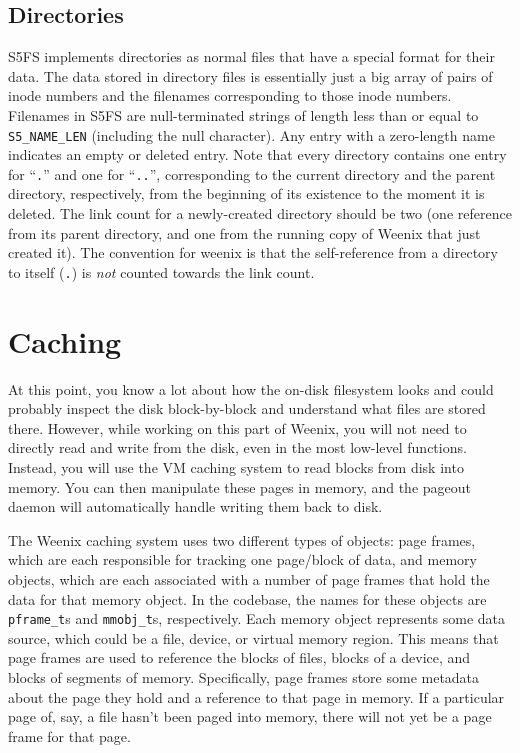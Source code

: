 \subsection{Directories} \label{directories}

S5FS implements directories as normal files that have a special format for their data. The data stored in directory files is essentially just a big array of pairs of inode numbers and the filenames corresponding to those inode numbers. Filenames in S5FS are null-terminated strings of length less than or equal to \texttt{S5\_NAME\_LEN} (including the null character). Any entry with a zero-length name indicates an empty or deleted entry. Note that every directory contains one entry for ``\texttt{.}'' and one for ``\texttt{..}'', corresponding to the current directory and the parent directory, respectively, from the beginning of its existence to the moment it is deleted. The link count for a newly-created directory should be two (one reference from its parent directory, and one from the running copy of Weenix that just created it). The convention for weenix is that the self-reference from a directory to itself (\texttt{.}) is \emph{not} counted towards the link count.

\section{Caching}

At this point, you know a lot about how the on-disk filesystem looks and could probably inspect the disk block-by-block and understand what files are stored there. However, while working on this part of Weenix, you will not need to directly read and write from the disk, even in the most low-level functions. Instead, you will use the VM caching system to read blocks from disk into memory. You can then manipulate these pages in memory, and the pageout daemon will automatically handle writing them back to disk.

The Weenix caching system uses two different types of objects: page frames, which are each responsible for tracking one page/block of data, and memory objects, which are each associated with a number of page frames that hold the data for that memory object. In the codebase, the names for these objects are \texttt{pframe\_t}s and \texttt{mmobj\_t}s, respectively. Each memory object represents some data source, which could be a file, device, or virtual memory region. This means that page frames are used to reference the blocks of files, blocks of a device, and blocks of segments of memory. Specifically, page frames store some metadata about the page they hold and a reference to that page in memory. If a particular page of, say, a file hasn't been paged into memory, there will not yet be a page frame for that page.

